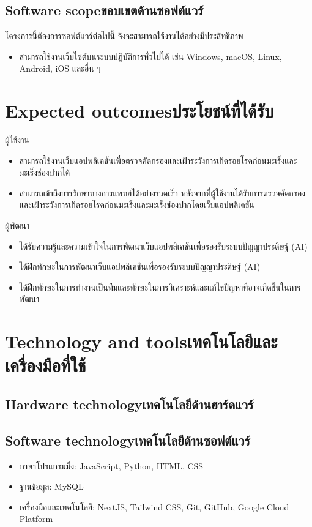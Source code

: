 \subsection{\ifenglish Software scope\else ขอบเขตด้านซอฟต์แวร์\fi}
โครงการนี้ต้องการซอฟต์แวร์ต่อไปนี้ จึงจะสามารถใช้งานได้อย่างมีประสิทธิภาพ
\begin{itemize}
    \item สามารถใช้งานเว็บไซต์บนระบบปฏิบัติการทั่วไปได้ เช่น Windows, macOS, Linux, Android, iOS และอื่น ๆ
\end{itemize}

\section{\ifenglish Expected outcomes\else ประโยชน์ที่ได้รับ\fi}
ผู้ใช้งาน
\begin{itemize}
    \item สามารถใช้งานเว็บแอปพลิเคชันเพื่อตรวจคัดกรองและเฝ้าระวังการเกิดรอยโรคก่อนมะเร็งและมะเร็งช่องปากได้
    \item สามารถเข้าถึงการรักษาทางการแพทย์ได้อย่างรวดเร็ว หลังจากที่ผู้ใช้งานได้รับการตรวจคัดกรองและเฝ้าระวังการเกิดรอยโรคก่อนมะเร็งและมะเร็งช่องปากโดยเว็บแอปพลิเคชัน
\end{itemize}
ผู้พัฒนา
\begin{itemize}
    \item ได้รับความรู้และความเข้าใจในการพัฒนาเว็บแอปพลิเคชันเพื่อรองรับระบบปัญญาประดิษฐ์ (AI)
    \item ได้ฝึกทักษะในการพัฒนาเว็บแอปพลิเคชันเพื่อรองรับระบบปัญญาประดิษฐ์ (AI)
    \item ได้ฝึกทักษะในการทำงานเป็นทีมและทักษะในการวิเคราะห์และแก้ไขปัญหาที่อาจเกิดขึ้นในการพัฒนา
\end{itemize}

\section{\ifenglish Technology and tools\else เทคโนโลยีและเครื่องมือที่ใช้\fi}

\subsection{\ifenglish Hardware technology\else เทคโนโลยีด้านฮาร์ดแวร์\fi}

\subsection{\ifenglish Software technology\else เทคโนโลยีด้านซอฟต์แวร์\fi}
\begin{itemize}
    \item ภาษาโปรแกรมมิ่ง: JavaScript, Python, HTML, CSS
    \item ฐานข้อมูล: MySQL
    \item เครื่องมือและเทคโนโลยี: NextJS, Tailwind CSS, Git, GitHub, Google Cloud Platform
\end{itemize}

